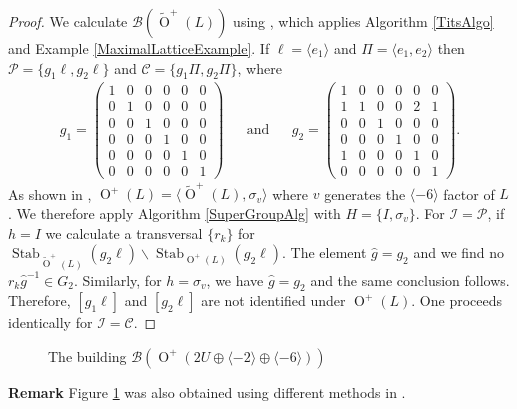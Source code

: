 \documentclass[12pt, a4paper]{article}
\newcommand{\la}{\langle}
\newcommand{\ra}{\rangle}
\newcommand{\bc}{\mathcal{B}}
\newcommand{\Cc}{\mathcal{C}}
\newcommand{\cc}{\mathcal{C}}
\newcommand{\ic}{\mathcal{I}}
\newcommand{\pc}{\mathcal{P}}
\newcommand{\opn}{\operatorname}
\newcommand{\op}{\oplus}
\newcommand{\bpm}{\begin{pmatrix}}
\newcommand{\epm}{\end{pmatrix}}
\newcommand{\ol}{\opn{O}^+(L)}
\newcommand{\otl}{\widetilde{\opn{O}}^+(L)}
\begin{document}
\begin{proof}
  We calculate $\bc(\widetilde{\opn{O}}^+(L))$ using \cite{boundary}, which applies Algorithm \ref{TitsAlgo} and Example \ref{MaximalLatticeExample}.
If $\ell = \la e_1 \ra$ and $\Pi=\la e_1, e_2 \ra$ then $\pc = \{g_1 \ell, g_2 \ell \}$ and $\cc = \{g_1 \Pi, g_2 \Pi \}$, where
\begin{align*}
  g_1 =
  \bpm
  1 & 0 & 0 & 0 & 0 & 0 \\
  0 & 1 & 0 & 0 & 0 & 0 \\
  0 & 0 & 1 & 0 & 0 & 0 \\
  0 & 0 & 0 & 1 & 0 & 0 \\
  0 & 0 & 0 & 0 & 1 & 0 \\
  0 & 0 & 0 & 0 & 0 & 1 
  \epm
  && \text{and} &&
  g_2 =
  \bpm
  1 & 0 & 0 & 0 & 0 & 0 \\
  1 & 1 & 0 & 0 & 2 & 1 \\
  0 & 0 & 1 & 0 & 0 & 0 \\
  0 & 0 & 0 & 1 & 0 & 0 \\
  1 & 0 & 0 & 0 & 1 & 0 \\
  0 & 0 & 0 & 0 & 0 & 1
  \epm.
\end{align*}
  As shown in \cite[Lemma 2.4]{DawesFamily}, $\opn{O}^+(L) = \la \widetilde{\opn{O}}^+(L), \sigma_v \ra$ where $v$ generates the $\la -6 \ra$ factor of $L$.
  We therefore apply Algorithm \ref{SuperGroupAlg} with $H = \{I, \sigma_v \}$.
  For  $\ic = \pc$, if $h = I$ we calculate a transversal $\{r_k\}$ for $\opn{Stab}_{\otl}(g_2 \ell) \backslash \opn{Stab}_{\ol}(g_2 \ell)$.
  The element $\hat{g}=g_2$ and we find  no $r_k \hat{g}^{-1} \in G_2$. 
  Similarly, for $h=\sigma_v$, we have $\hat{g}=g_2$ and the same conclusion follows.
  Therefore, $[g_1 \ell]$ and $[g_2 \ell]$ are not identified under $\opn{O}^+(L)$.
  One proceeds identically for $\ic = \Cc$.
\end{proof}
\begin{figure}
  \centering
  \caption{The building $\bc(\opn{O}^+(2U \op \la - 2 \ra \op \la -6 \ra))$}\label{gkbuilding}
\end{figure}
\noindent \textbf{Remark}
Figure \ref{gkbuilding} was also obtained using different methods in \cite{DawesFamily}. 
\end{document}
